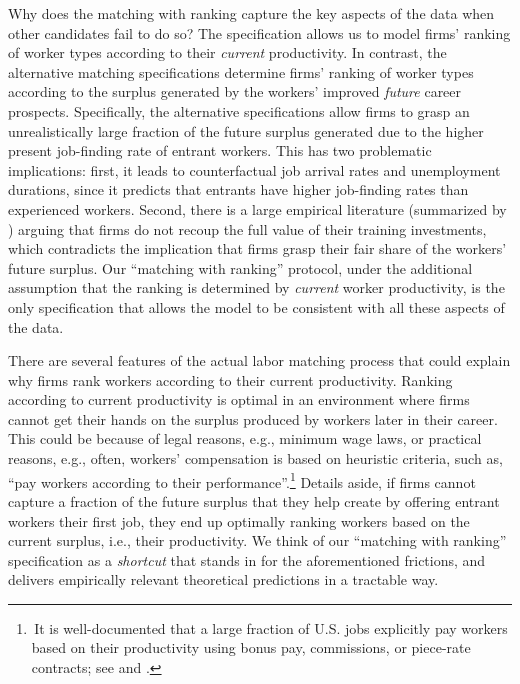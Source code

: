 \documentclass[12pt]{article} %
\theoremstyle{definition}
\begin{document}
Why does the \cite{petrongolo2001looking} matching with ranking capture the key aspects of the data when other candidates fail to do so?
The \cite{petrongolo2001looking} specification allows us to model firms' ranking of worker types according to their \textit{current} productivity. 
In contrast, the alternative matching specifications
determine firms' ranking of worker types according to the surplus generated by the workers' improved \textit{future} career prospects.
Specifically, the alternative specifications allow firms to grasp an unrealistically large fraction of the future surplus generated due to the higher present job-finding rate of entrant workers. 
This has two problematic implications: first, it leads to counterfactual job arrival rates and unemployment durations, since it predicts that entrants have higher job-finding rates than experienced workers. 
Second, there is a large empirical literature  (summarized by \citealt{pallais2014inefficient}) arguing that firms do not recoup the full value of their training investments, which contradicts the implication that firms grasp their fair share of the workers' future surplus. 
Our ``matching with ranking'' protocol, under the additional assumption that the ranking is determined by \textit{current} worker productivity, is the only specification that allows the model to be consistent with all these aspects of the data.


There are several features of the actual labor matching process that could explain why firms rank workers according to their current productivity.
Ranking according to current productivity is optimal in an environment where firms cannot get their hands on the surplus produced by workers later in their career.
This could be because of legal reasons, e.g., minimum wage laws, or practical reasons, e.g., often, workers' compensation is based on heuristic criteria, such as, ``pay workers according to their performance''.\footnote{\,It is well-documented that a large fraction of U.S.  jobs explicitly pay workers based on their productivity using bonus pay, commissions,  or piece-rate contracts; see \cite{lazear2000performance} and \cite{lemieux2009performance}.} 
Details aside, if firms cannot capture a fraction of the future surplus that they help create by offering entrant workers their first job, they end up optimally ranking workers based on the current surplus, i.e., their productivity. 
We think of our ``matching with ranking'' specification as a \textit{shortcut} that stands in for the aforementioned frictions, and delivers empirically relevant theoretical predictions in a tractable way.  
\end{document}
